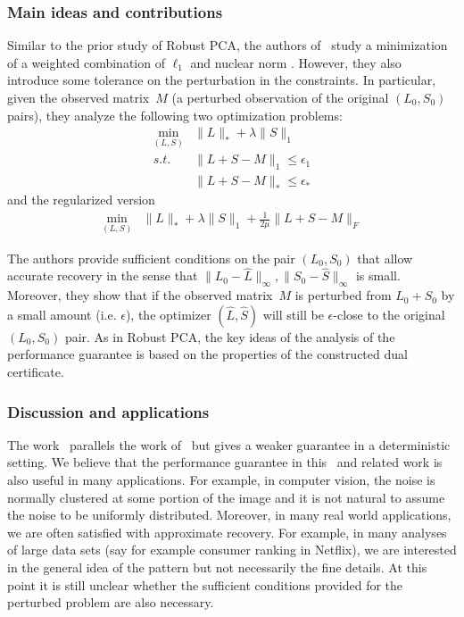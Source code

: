 \subsubsection{Main ideas and contributions}
%
Similar to the prior study of Robust PCA, the authors of~\cite{Hsu:2011ys} study a minimization
of a weighted combination of $\ell_{1}$ and nuclear norm . However, they also introduce some tolerance on the perturbation in the constraints. In particular, given the observed matrix~$M$ (a perturbed observation of the original $(L_{0},S_{0})$ pairs), they analyze the following two optimization problems: %
%
\begin{eqnarray}
\min_{(L,S)} & \|L\|_{*}+\lambda\|S\|_{1}\nonumber \\
s.t. & \|L+S-M\|_{1}\le\epsilon_{1}\\
 & \|L+S-M\|_{*}\le\epsilon_{*}\nonumber
\end{eqnarray}
%
and the regularized version
\begin{eqnarray}
\min_{(L,S)} & \|L\|_{*}+\lambda\|S\|_{1}+\frac{1}{2\mu}\|L+S-M\|_{F}
\end{eqnarray}


The authors provide sufficient conditions on the pair $(L_{0},S_{0})$ that allow accurate recovery in the sense that $\|L_{0}-\hat{L}\|_{\infty},\|S_{0}-\hat{S}\|_{\infty}$ is small. Moreover, they show that if the observed matrix~$M$ is perturbed from $L_{0}+S_{0}$ by a small amount (i.e. $\epsilon$), the optimizer $(\hat{L},\hat{S})$ will still be $\epsilon$-close to the original $(L_{0},S_{0})$ pair. As in Robust PCA, the key ideas of the analysis of the performance guarantee is based on the properties of the constructed dual certificate.

\subsubsection{Discussion and applications}
The work~\cite{Hsu:2011ys} parallels the work of~\cite{Candes:2011fk} but gives a weaker guarantee in a deterministic setting. %
We believe that the performance guarantee in this~\cite{Hsu:2011ys} and related work is also useful in many applications. For example, in computer vision, the noise  is normally clustered at some portion of the image and it is not natural to assume the noise to be uniformly distributed. Moreover, in many real world applications, we are often satisfied with approximate recovery. %
For example, in many analyses of large data sets (say for example consumer ranking in Netflix), we are interested in the general idea of the pattern but not necessarily the fine details. At this point it is still unclear whether the sufficient conditions provided for the perturbed problem are also necessary. %




